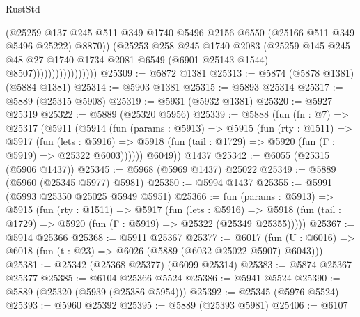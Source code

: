 \begin{lexlean}{RustStd}
\begin{coremodule}
                                    (@25259
                                      @137
                                      @245
                                      @511
                                      @349
                                      @1740
                                      @5496
                                      @2156
                                      @6550
                                      (@25166 @511 @349 @5496 @25222)
                                      @8870))
                                  (@25253
                                    @258
                                    @245
                                    @1740
                                    @2083
                                    (@25259
                                      @145
                                      @245
                                      @48
                                      @27
                                      @1740
                                      @1734
                                      @2081
                                      @6549
                                      (@6901 @25143 @1544)
                                      @8507)))))))))))))))))
@25309 := @5872 @1381
@25313 := @5874 (@5878 @1381) (@5884 @1381)
@25314 := @5903 @1381
@25315 := @5893 @25314
@25317 := @5889 (@25315 @5908)
@25319 := @5931 (@5932 @1381)
@25320 := @5927 @25319
@25322 := @5889 (@25320 @5956)
@25339 := @5888
    (fun (fn : @7) =>
    @25317
      (@5911
        (@5914
          (fun (params : @5913) =>
          @5915
            (fun (rty : @1511) =>
            @5917
              (fun (lets : @5916) =>
              @5918 (fun (tail : @1729) => @5920 (fun (Γ : @5919) => @25322 @6003))))))
        @6049))
    @1437
@25342 := @6055 (@25315 (@5906 @1437))
@25345 := @5968 (@5969 @1437) @25022
@25349 := @5889 (@5960 (@25345 @5977) @5981)
@25350 := @5994 @1437
@25355 := @5991 (@5993 @25350 @25025 @5949 @5951)
@25366 := fun (params : @5913) =>
  @5915
    (fun (rty : @1511) =>
    @5917
      (fun (lets : @5916) =>
      @5918 (fun (tail : @1729) => @5920 (fun (Γ : @5919) => @25322 (@25349 @25355)))))
@25367 := @5914 @25366
@25368 := @5911 @25367
@25377 := @6017
    (fun (U : @6016) => @6018 (fun (t : @23) => @6026 (@5889 (@6032 @25022 @5907) @6043)))
@25381 := @25342 (@25368 @25377) (@6099 @25314)
@25383 := @5874 @25367 @25377
@25385 := @6104 @25366 @5524
@25386 := @5941 @5524
@25390 := @5889 (@25320 (@5939 (@25386 @5954)))
@25392 := @25345 (@5976 @5524)
@25393 := @5960 @25392
@25395 := @5889 (@25393 @5981)
@25406 := @6107

\end{coremodule}
\end{lexlean}
